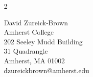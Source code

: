 \documentclass[a4paper,10pt]{article}
\begin{document}
\begin{multicols}{2}
\begin{flushleft}
	David Zureick-Brown \\
	Amherst College \\
	202 Seeley Mudd Building\\
	31 Quadrangle\\
	Amherst, MA 01002\\
	dzureickbrown@amherst.edu\\
	 \ \\ \ \\ 
\end{flushleft}


\end{multicols}
\fi
\end{document}
